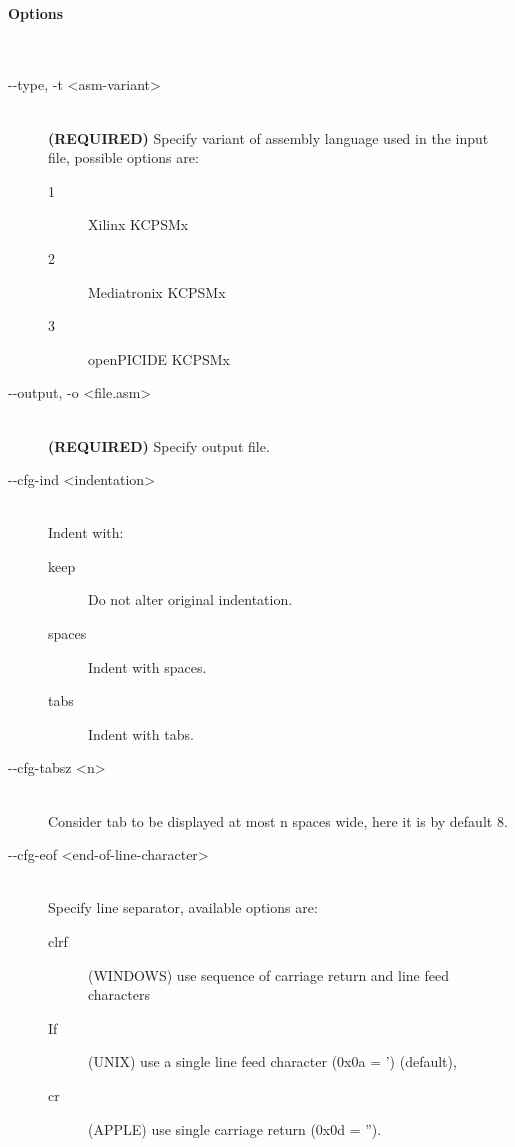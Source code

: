     \paragraph{Options}~\\
        \begin{description}
            \item[-{}-type, -t <asm-variant>]~\\
                \textbf{(REQUIRED)} Specify variant of assembly language used in the input file, possible options are:
                \begin{description}
                    \item [1] Xilinx KCPSMx
                    \item [2] Mediatronix KCPSMx
                    \item [3] openPICIDE KCPSMx
                \end{description}

            \item[-{}-output, -o <file.asm>]~\\
                \textbf{(REQUIRED)} Specify output file.

            \item[-{}-cfg-ind <indentation>]~\\
                Indent with:
                \begin{description}
                    \item [keep] Do not alter original indentation.
                    \item [spaces] Indent with spaces.
                    \item [tabs] Indent with tabs.
                \end{description}

            \item[-{}-cfg-tabsz <n>]~\\
                Consider tab to be displayed at most n spaces wide, here it is by default 8.

            \item[-{}-cfg-eof <end-of-line-character>]~\\
                Specify line separator, available options are:
                \begin{description}
                    \item [clrf] (WINDOWS) use sequence of carriage return and line feed characters
                    \item [If] (UNIX) use a single line feed character (0x0a = ') (default),
                    \item [cr] (APPLE) use single carriage return (0x0d = '').
                \end{description}


\end{description}
